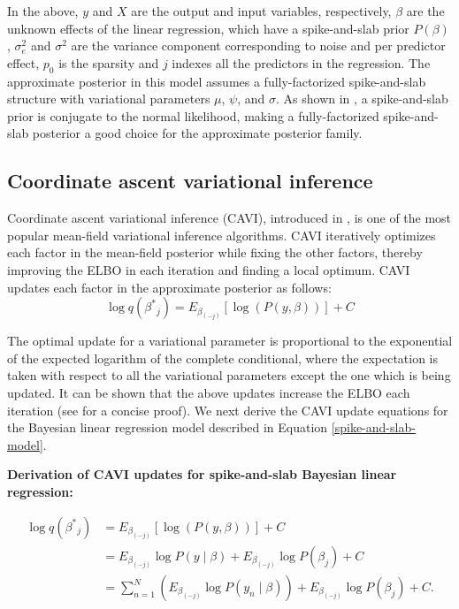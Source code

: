 In the above, $y$ and $X$ are the output and input variables, respectively, $\beta$ are the unknown effects of the linear regression, which have a spike-and-slab prior $P(\beta)$, $\sigma_e^2$ and $\sigma^2$ are the variance component corresponding to noise and per predictor effect, $p_0$ is the sparsity and $j$ indexes all the predictors in the regression.
%
The approximate posterior in this model assumes a fully-factorized spike-and-slab structure with variational parameters $\mu$, $\psi$, and $\sigma$.
%
As shown in \cite{spence2020flexible}, a spike-and-slab prior is conjugate to the normal likelihood, making a fully-factorized spike-and-slab posterior a good choice for the approximate posterior family. 

\subsection{Coordinate ascent variational inference}
Coordinate ascent variational inference (CAVI), introduced in \cite{bishop2006pattern}, is one of the most popular mean-field variational inference algorithms.
%
CAVI iteratively optimizes each factor in the mean-field posterior while fixing the other factors, thereby improving the ELBO in each iteration and finding a local optimum.
%
CAVI updates each factor in the approximate posterior as follows:
\begin{equation}
    \log q(\beta^{*}{_j}) = E_{\beta_{(-j)}} [\log(P(y, \beta))] + C \label{cavi}
\end{equation}

%
The optimal update for a variational parameter is proportional to the exponential of the expected logarithm of the complete conditional, where the expectation is taken with respect to all the variational parameters except the one which is being updated.
%
It can be shown that the above updates increase the ELBO each iteration (see \cite{blei2017variational} for a concise proof).
%
We next derive the CAVI update equations for the Bayesian linear regression model described in Equation \ref{spike-and-slab-model}.
%

\newpage

%
\noindent \textbf{Derivation of CAVI updates for spike-and-slab Bayesian linear regression:}

\begin{align}
    \log q(\beta^{*}{_j}) &= E_{\beta_{(-j)}} [\log(P(y, \beta))] + C \nonumber \\
    &= E_{\beta_{(-j)}} \log P(y \mid \beta) + E_{\beta_{(-j)}} \log P(\beta_j) + C \nonumber \\
    &= \sum_{n=1}^N \left( E_{\beta_{(-j)}} \log P(y_n \mid \beta) \right) + E_{\beta_{(-j)}} \log P(\beta_j) + C \label{cavi-1}.
\end{align}

